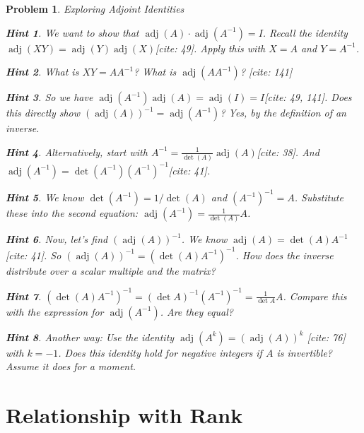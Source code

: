 \documentclass[12pt]{article}
\newtheorem{problem}{Problem}[section]
\theoremstyle{definition}
\newtheorem{hint}{Hint}[question]
\newcommand{\adj}{\operatorname{adj}}
\newcommand{\detm}{\operatorname{det}}
\begin{document}
\begin{problem}{Exploring Adjoint Identities}
        \begin{hint}
            We want to show that $\adj(A) \cdot \adj(A^{-1}) = I$. Recall the identity $\adj(XY) = \adj(Y)\adj(X)$[cite: 49]. Apply this with $X=A$ and $Y=A^{-1}$.
        \end{hint}
        \begin{hint}
            What is $XY = A A^{-1}$? What is $\adj(A A^{-1})$? [cite: 141]
        \end{hint}
        \begin{hint}
            So we have $\adj(A^{-1})\adj(A) = \adj(I) = I$[cite: 49, 141]. Does this directly show $(\adj(A))^{-1} = \adj(A^{-1})$? Yes, by the definition of an inverse.
        \end{hint}
        \begin{hint}
            Alternatively, start with $A^{-1} = \frac{1}{\detm(A)} \adj(A)$[cite: 38]. And $\adj(A^{-1}) = \detm(A^{-1}) (A^{-1})^{-1}$[cite: 41].
        \end{hint}
        \begin{hint}
            We know $\detm(A^{-1}) = 1/\detm(A)$ and $(A^{-1})^{-1} = A$. Substitute these into the second equation: $\adj(A^{-1}) = \frac{1}{\detm(A)} A$.
        \end{hint}
        \begin{hint}
            Now, let's find $(\adj(A))^{-1}$. We know $\adj(A) = \detm(A) A^{-1}$[cite: 41]. So $(\adj(A))^{-1} = (\detm(A) A^{-1})^{-1}$. How does the inverse distribute over a scalar multiple and the matrix?
        \end{hint}
        \begin{hint}
            $(\detm(A) A^{-1})^{-1} = (\detm A)^{-1} (A^{-1})^{-1} = \frac{1}{\detm A} A$. Compare this with the expression for $\adj(A^{-1})$. Are they equal?
        \end{hint}
         \begin{hint}
             Another way: Use the identity $\adj(A^k) = (\adj(A))^k$ [cite: 76] with $k=-1$. Does this identity hold for negative integers if $A$ is invertible? Assume it does for a moment.
         \end{hint}
    
\end{problem}

\section{Relationship with Rank}
\end{document}
